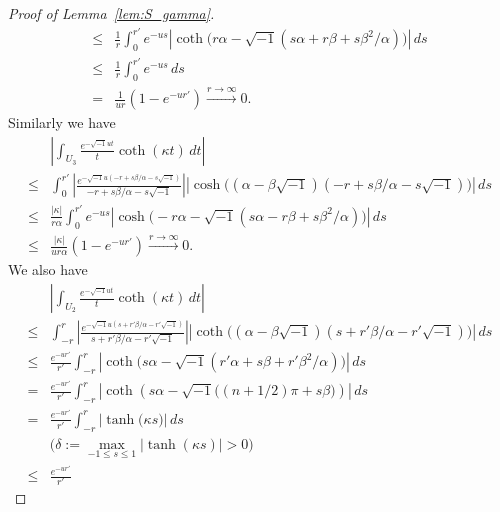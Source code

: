 \documentclass[a4paper]{amsart}
\theoremstyle{plain}
\theoremstyle{definition}
\theoremstyle{remark}
\numberwithin{equation}{section}
\begin{document}
\begin{proof}[Proof of Lemma~\ref{lem:S_gamma}]
\begin{equation*}
\begin{split}
  \le&
  \frac{1}{r}
  \int_{0}^{r'}
  e^{-us}
  \left|
    \coth\bigl(r\alpha-\sqrt{-1}(s\alpha+r\beta+s\beta^2/\alpha)\bigr)
  \right|
  \,ds
  \\
  \le&
  \frac{1}{r}
  \int_{0}^{r'}
  e^{-us}
  \,ds
  \\
  =&
  \frac{1}{ur}
  (1-e^{-ur'})
  \xrightarrow{r\to\infty}0.
\end{split}
\end{equation*}
Similarly we have
\begin{equation*}
\begin{split}
  &\left|
    \int_{U_3}
    \frac{e^{-\sqrt{-1}ut}}{t}
    \coth(\kappa t)
    \,dt
  \right|
  \\
  \le&
  \int_{0}^{r'}
  \left|
    \frac{e^{-\sqrt{-1}u(-r+s\beta/\alpha-s\sqrt{-1})}}
         {-r+s\beta/\alpha-s\sqrt{-1}}
  \right|
  \left|
    \cosh\bigl((\alpha-\beta\sqrt{-1})(-r+s\beta/\alpha-s\sqrt{-1})\bigr)
  \right|
  \,ds
  \\
  \le&
  \frac{|\kappa|}{r\alpha}
  \int_{0}^{r'}
  e^{-us}
  \left|
    \cosh\bigl(-r\alpha-\sqrt{-1}(s\alpha-r\beta+s\beta^2/\alpha)\bigr)
  \right|
  \,ds
  \\
  \le&
  \frac{|\kappa|}{ur\alpha}
  (1-e^{-ur'})
  \xrightarrow{r\to\infty}0.
\end{split}
\end{equation*}
We also have
\begin{equation*}
\begin{split}
  &\left|
    \int_{U_2}
    \frac{e^{-\sqrt{-1}ut}}{t}
    \coth(\kappa t)
    \,dt
  \right|
  \\
  \le&
  \int_{-r}^{r}
  \left|
    \frac{e^{-\sqrt{-1}u(s+r'\beta/\alpha-r'\sqrt{-1})}}
         {s+r'\beta/\alpha-r'\sqrt{-1}}
  \right|
  \left|
    \coth\bigl((\alpha-\beta\sqrt{-1})(s+r'\beta/\alpha-r'\sqrt{-1})\bigr)
  \right|
  \,ds
  \\
  \le&
  \frac{e^{-ur'}}{r'}
  \int_{-r}^{r}
  \left|
   \coth\bigl(s\alpha-\sqrt{-1}(r'\alpha+s\beta+r'\beta^2/\alpha)\bigr)
  \right|
  \,ds
  \\
  =&
  \frac{e^{-ur'}}{r'}
  \int_{-r}^{r}
  \left|
   \coth
   \left(
     s\alpha-\sqrt{-1}\bigl((n+1/2)\pi+s\beta\bigr)
   \right)
  \right|
  \,ds
  \\
  =&
  \frac{e^{-ur'}}{r'}
  \int_{-r}^{r}
  \left|
    \tanh\bigl(\kappa s\bigr)
  \right|
  \,ds
  \\
  &\text{($\delta:=\max_{-1\le s\le1}|\tanh(\kappa s)|>0$)}
  \\
  \le&
  \frac{e^{-ur'}}{r'}

\end{split}
\end{equation*}
\end{proof}
\end{document}
